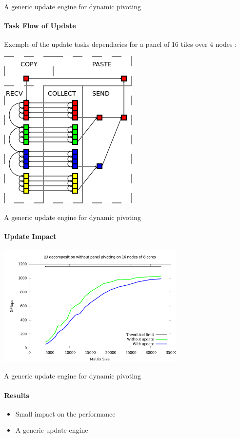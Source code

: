 \begin{frame}{A generic update engine for dynamic pivoting}
\framesubtitle{Task Flow of Update}
Exemple of the update tasks dependacies for a panel of 16 tiles over 4 nodes :
\begin{center}
\includegraphics[scale=0.5]{swap_opt.png}
\end{center}
\end{frame}

\begin{frame}{A generic update engine for dynamic pivoting}
\framesubtitle{Update Impact}
\begin{center}
\includegraphics[width=0.7\textwidth]{dgetrf_update_problem.png} 
\end{center}
\end{frame}

\begin{frame}{A generic update engine for dynamic pivoting}
\framesubtitle{Results}
\begin{itemize}
\item Small impact on the performance
\item A generic update engine
\end{itemize}
\end{frame}